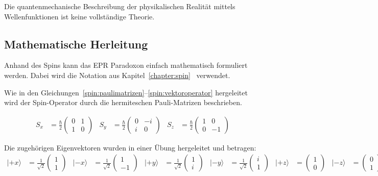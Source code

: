 \begin{refsection}
\begin{satz}
    Die quantenmechanische Beschreibung der physikalischen Realit\"at mittels
    Wellenfunktionen ist keine vollst\"andige Theorie.
\end{satz}

\subsection{Mathematische Herleitung\label{subsection:bell:epr:herleitung}}
Anhand des Spins kann das EPR Paradoxon einfach mathematisch formuliert werden.
Dabei wird die Notation aus Kapitel~\ref{chapter:spin}~
verwendet.

Wie in den Gleichungen~\ref{spin:paulimatrizen}--\ref{spin:vektoroperator}
hergeleitet wird der Spin-Operator durch die hermiteschen Pauli-Matrizen
beschrieben.

\begin{align*}
    S_x &= \frac{\hbar}{2} \begin{pmatrix}
    0 & 1 \\ 1 & 0
    \end{pmatrix}
    &
    S_y &= \frac{\hbar}{2} \begin{pmatrix}
    0 & -i \\ i & 0
    \end{pmatrix}
    &
    S_z &= \frac{\hbar}{2} \begin{pmatrix}
    1 & 0 \\ 0 & -1
    \end{pmatrix}
\end{align*}

Die zugeh\"origen Eigenvektoren wurden in einer \"Ubung hergeleitet und
betragen:
\begin{align*}
    |{+}x\rangle &= \frac{1}{\sqrt{2}}\begin{pmatrix} 1\\1 \end{pmatrix} &
    |{-}x\rangle &= \frac{1}{\sqrt{2}}\begin{pmatrix} 1\\-1 \end{pmatrix} &
    |{+}y\rangle &= \frac{1}{\sqrt{2}}\begin{pmatrix} 1\\i \end{pmatrix} &
    |{-}y\rangle &= \frac{1}{\sqrt{2}}\begin{pmatrix} i\\1 \end{pmatrix} &
    |{+}z\rangle &= \begin{pmatrix} 1\\0 \end{pmatrix} &
    |{-}z\rangle &= \begin{pmatrix} 0\\1 \end{pmatrix} &
\end{align*}


\end{refsection}

